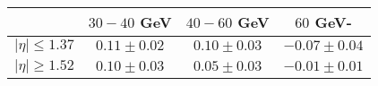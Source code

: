 \centering
\begin{tabular}{|c|c|c|c|} \hline
 & $30-40$ GeV & $40-60$ GeV & $60$ GeV-\\\hline
$\lvert \eta \rvert \leq 1.37$ & $0.11\pm0.02$ & $0.10\pm0.03$ & $-0.07\pm0.04$\\\hline
$\lvert \eta \rvert \geq 1.52$ & $0.10\pm0.03$ & $0.05\pm0.03$ & $-0.01\pm0.01$\\\hline
\end{tabular}
